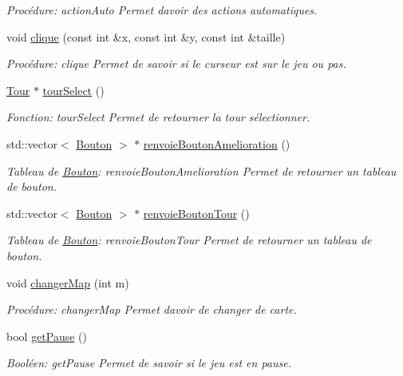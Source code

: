 \begin{DoxyCompactItemize}
\begin{DoxyCompactList}\small\item\em Procédure\+: action\+Auto Permet d\textquotesingle{}avoir des actions automatiques. \end{DoxyCompactList}\item 
void \hyperlink{classJeu_a6a95f56b4cdcf94806237e672de41d7f}{clique} (const int \&x, const int \&y, const int \&taille)
\begin{DoxyCompactList}\small\item\em Procédure\+: clique Permet de savoir si le curseur est sur le jeu ou pas. \end{DoxyCompactList}\item 
\hyperlink{classTour}{Tour} $\ast$ \hyperlink{classJeu_a495360d61991b02b3a5a702cef5bd4b2}{tour\+Select} ()
\begin{DoxyCompactList}\small\item\em Fonction\+: tour\+Select Permet de retourner la tour sélectionner. \end{DoxyCompactList}\item 
std\+::vector$<$ \hyperlink{classBouton}{Bouton} $>$ $\ast$ \hyperlink{classJeu_a09404fb1bfd86af39da4cb5945f22fa5}{renvoie\+Bouton\+Amelioration} ()
\begin{DoxyCompactList}\small\item\em Tableau de \hyperlink{classBouton}{Bouton}\+: renvoie\+Bouton\+Amelioration Permet de retourner un tableau de bouton. \end{DoxyCompactList}\item 
std\+::vector$<$ \hyperlink{classBouton}{Bouton} $>$ $\ast$ \hyperlink{classJeu_aea4394fb2f268e68eb8118d32286e8d7}{renvoie\+Bouton\+Tour} ()
\begin{DoxyCompactList}\small\item\em Tableau de \hyperlink{classBouton}{Bouton}\+: renvoie\+Bouton\+Tour Permet de retourner un tableau de bouton. \end{DoxyCompactList}\item 
void \hyperlink{classJeu_ada22a232d25c271778a3a0b0ecdd61c9}{changer\+Map} (int m)
\begin{DoxyCompactList}\small\item\em Procédure\+: changer\+Map Permet d\textquotesingle{}avoir de changer de carte. \end{DoxyCompactList}\item 
bool \hyperlink{classJeu_abcee93768971be5db133648851a0219e}{get\+Pause} ()
\begin{DoxyCompactList}\small\item\em Booléen\+: get\+Pause Permet de savoir si le jeu est en pause. \end{DoxyCompactList}\item 

\end{DoxyCompactItemize}
